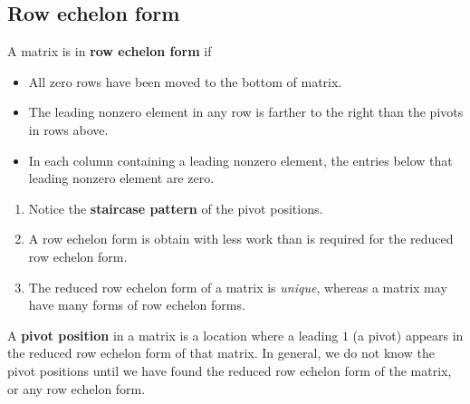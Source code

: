 \documentclass[math101_lecturenotes_ku.tex]{subfiles}
\begin{document}
\subsection{Row echelon form}
\begin{mdframed}[style=myframe]
        A matrix is in \textbf{row echelon form} if
        \begin{itemize}
            \item All zero rows have been moved to the bottom of matrix.
            \item The leading nonzero element in any row is farther to the right than the pivots in rows above.
            \item In each column containing a leading nonzero element, the entries below that leading nonzero element are zero.
        \end{itemize}
\end{mdframed}

\begin{enumerate}
    \item Notice the \textbf{staircase pattern} of the pivot positions.
    \item A row echelon form is obtain with less work than is required for the reduced row echelon form.
    \item The reduced row echelon form of a matrix is \textit{unique}, whereas a matrix may have many forms of row echelon forms.
\end{enumerate}
\begin{definition}
    A \textbf{pivot position} in a matrix is a location where a leading $1$ (a pivot) appears in the reduced row echelon form of that matrix. In general, we do not know the pivot positions until we have found the reduced row echelon form of the matrix, or any row echelon form.
\end{definition}
\end{document}
